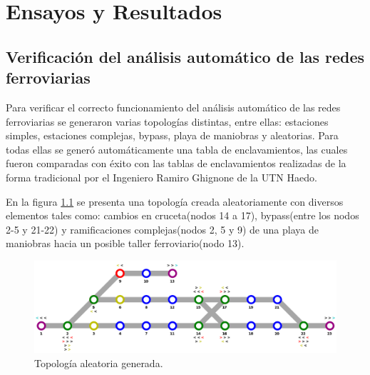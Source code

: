 
\chapter{Ensayos y Resultados} %

\label{Chapter4} %




\section{Verificación del análisis automático de las redes ferroviarias}
	
	Para verificar el correcto funcionamiento del análisis automático de las redes ferroviarias se generaron varias topologías distintas, entre ellas: estaciones simples, estaciones complejas, bypass, playa de maniobras y aleatorias. Para todas ellas se generó automáticamente una tabla de enclavamientos, las cuales fueron comparadas con éxito con las tablas de enclavamientos realizadas de la forma tradicional por el Ingeniero Ramiro Ghignone de la UTN Haedo.
	
	En la figura \ref{fig:Mapa_0} se presenta una topología creada aleatoriamente con diversos elementos tales como: cambios en cruceta(nodos 14 a 17), bypass(entre los nodos 2-5 y 21-22) y ramificaciones complejas(nodos 2, 5 y 9) de una playa de maniobras hacia un posible taller ferroviario(nodo 13).
	
	\begin{figure}[h]
	\centering
	\includegraphics[scale=0.45]{./Figures/Mapa_0}
		\caption{Topología aleatoria generada.}
		\label{fig:Mapa_0}
	\end{figure}
	
